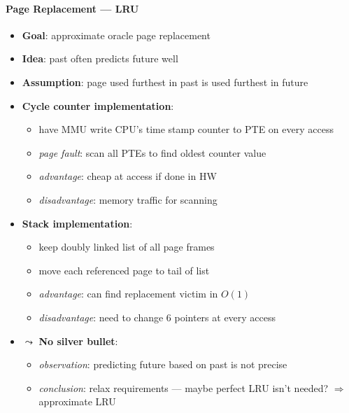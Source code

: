 \paragraph{Page Replacement --- LRU}
\begin{itemize}
  \item \textbf{Goal}: approximate oracle page replacement
  \item \textbf{Idea}: past often predicts future well
  \item \textbf{Assumption}: page used furthest in past is used furthest in future
  \item \textbf{Cycle counter implementation}:
  \begin{itemize}
    \item have MMU write CPU's time stamp counter to PTE on every access
    \item \emph{page fault}: scan all PTEs to find oldest counter value
    \item \emph{advantage}: cheap at access if done in HW
    \item \emph{disadvantage}: memory traffic for scanning
  \end{itemize}
  \item \textbf{Stack implementation}:
  \begin{itemize} 
    \item keep doubly linked list of all page frames
    \item move each referenced page to tail of list
    \item \emph{advantage}: can find replacement victim in $ O(1) $
    \item \emph{disadvantage}: need to change 6 pointers at every access
  \end{itemize}
  \item $ \leadsto $ \textbf{No silver bullet}:
  \begin{itemize}
    \item \emph{observation}: predicting future based on past is not precise
    \item \emph{conclusion}: relax requirements --- maybe perfect LRU isn't needed? $ \Rightarrow $ approximate LRU
  \end{itemize}
\end{itemize}

